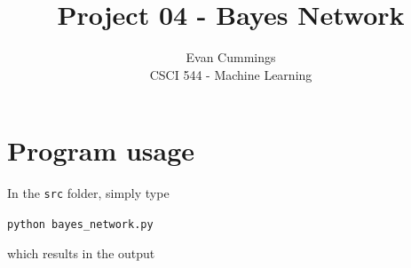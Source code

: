 
\DeclareMathOperator*{\argmax}{arg\,max}

\usepackage[top=.5in, bottom=1in, left=.75in, right=.75in]{geometry}
\usepackage{framed}
\setlength{\columnsep}{8mm}


\small
\twocolumn

\title{Project 04 - Bayes Network}
\author{Evan Cummings\\
CSCI 544 - Machine Learning}

\maketitle

\section{Program usage}

In the \texttt{src} folder, simply type

\centerline{\texttt{python bayes\_network.py}}

\noindent which results in the output

